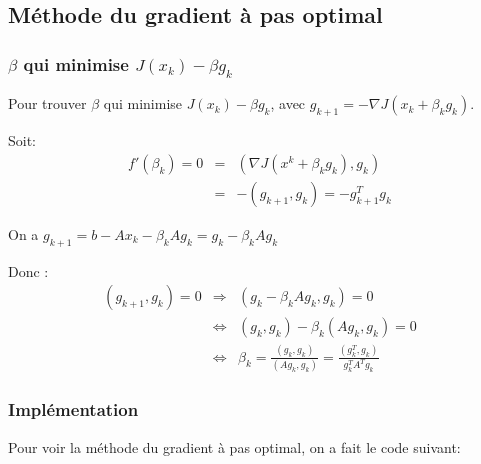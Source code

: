 \documentclass[a4paper,11pt]{article}
\begin{document}
\newpage
\subsection{Méthode du gradient à pas optimal}

\subsubsection{$\beta$ qui minimise $J(x_k)-\beta g_k$}

Pour trouver $\beta$ qui minimise $J(x_k)-\beta g_k$,
avec $g_{k+1}=-\nabla J(x_k+\beta_kg_k)$.

Soit:
\begin{eqnarray*}
f'(\beta_k)= 0 &=& (\nabla J(x^k+\beta_kg_k),g_k)\\
&=&-(g_{k+1},g_k)=-g_{k+1}^Tg_k
\end{eqnarray*}

On a $g_{k+1}= b -Ax_k-\beta_kAg_k=g_k-\beta_kAg_k$

Donc :
\begin{eqnarray*}
 (g_{k+1},g_k) = 0  &\Rightarrow&  (g_k-\beta_kAg_k,g_k)  = 0\\
   & \Leftrightarrow& (g_{k},g_k)-\beta_k(Ag_k,g_k) = 0\\
  & \Leftrightarrow&  \beta_k=\frac{(g_{k},g_k)}{(Ag_k,g_k)}= \frac{(g_{k}^T,g_k)}{g_k^TA^Tg_k}
\end{eqnarray*}


\subsubsection{Implémentation}
Pour voir la méthode du gradient à pas optimal, on a fait le code suivant:

\begin{multicols}{2}
  
\end{multicols}
\end{document}
